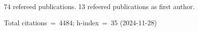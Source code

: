 74 refereed publications. 13 refeered publications as first author.

Total citations~=~4484; h-index~=~35 (2024-11-28)